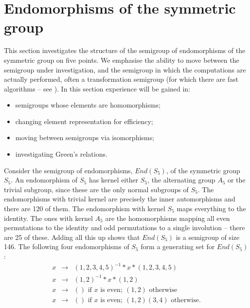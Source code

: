 \documentclass[12pt]{article}
\theoremstyle{plain} \newtheorem{Thm}{Theorem}
\theoremstyle{plain} \newtheorem{Cor}{Corollary}
\theoremstyle{plain} \newtheorem{Lemma}{Lemma}
\theoremstyle{plain} \newtheorem{Prop}{Proposition}
\theoremstyle{plain} \newtheorem{Ex}{Exercise}
\begin{document}
\section{Endomorphisms of the symmetric group}
This section investigates the structure of 
the semigroup of endomorphisms of the symmetric group on five points.
We emphasise the ability to move between the semigroup
under investigation, and the semigroup in which the computations
are actually performed, often a transformation semigroup 
(for which there are fast algorithms -- see \cite{linton_tsemi}).
In this section experience will be gained in:
\begin{itemize}
\item semigroups whose elements are homomorphisms;
\item changing element representation for efficiency;
\item moving between semigroups via isomorphisms;
\item investigating Green's relations.
\end{itemize}

Consider the semigroup of endomorphisms, $End(S_5)$, 
of the symmetric group $S_5$.
An endomorphism of $S_5$ has kernel either $S_5$, the alternating
group  $A_5$ 
or the trivial subgroup,
since these are the only normal subgroups of $S_5$.
The endomorphisms with trivial kernel are precisely the inner automorphisms 
and there are 120 of them.
The endomorphism with kernel $S_5$ 
maps everything to the identity.
The ones with kernel $A_5$ are the homomorphisms mapping all even permutations
to the identity and odd permutations to a single involution --
there are 25 of these. 
Adding all this up shows that $End(S_5)$ is a semigroup of size 146. 
The following four endomorphisms of $S_5$ form a  generating 
set for $End(S_5)$:
\begin{eqnarray*}
x & \rightarrow & (1,2,3,4,5)^{-1} * x * (1,2,3,4,5)\\
x & \rightarrow & (1,2)^{-1} * x * (1,2)\\
x & \rightarrow & () \mbox{ if }x\mbox{ is even};\ (1,2) \mbox{ otherwise }\\
x & \rightarrow & 
                () \mbox{ if } x \mbox{ is even};\ (1,2)(3,4)\mbox{ otherwise}.
\end{eqnarray*}
\end{document}
